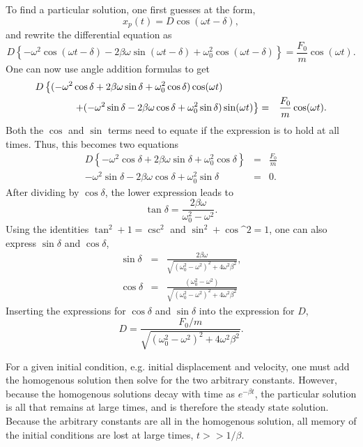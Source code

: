 To find a particular solution, one first guesses at the form,
\begin{equation}
\label{eq:partform}
x_p(t)=D\cos(\omega t-\delta),
\end{equation}
and rewrite the differential equation as
\begin{equation}
D\left\{-\omega^2\cos(\omega t-\delta)-2\beta\omega\sin(\omega t-\delta)+\omega_0^2\cos(\omega t-\delta)\right\}=\frac{F_0}{m}\cos(\omega t).
\end{equation}
One can now use angle addition formulas to get
\begin{eqnarray}
D\left\{(-\omega^2\cos\delta+2\beta\omega\sin\delta+\omega_0^2\cos\delta)\cos(\omega t)\right.\hspace*{36pt}&&\\
\nonumber
\left.+(-\omega^2\sin\delta-2\beta\omega\cos\delta+\omega_0^2\sin\delta)\sin(\omega t)\right\}
&=&\frac{F_0}{m}\cos(\omega t).
\end{eqnarray}
Both the $\cos$ and $\sin$ terms need to equate if the expression is to hold at all times. Thus, this becomes two equations
\begin{eqnarray}
D\left\{-\omega^2\cos\delta+2\beta\omega\sin\delta+\omega_0^2\cos\delta\right\}&=&\frac{F_0}{m}\\
\nonumber
-\omega^2\sin\delta-2\beta\omega\cos\delta+\omega_0^2\sin\delta&=&0.
\end{eqnarray}
After dividing by $\cos\delta$, the lower expression leads to
\begin{equation}
\tan\delta=\frac{2\beta\omega}{\omega_0^2-\omega^2}.
\end{equation}
Using the identities $\tan^2+1=\csc^2$ and $\sin^2+\cos\^2=1$, one can also express $\sin\delta$ and $\cos\delta$,
\begin{eqnarray}
\sin\delta&=&\frac{2\beta\omega}{\sqrt{(\omega_0^2-\omega^2)^2+4\omega^2\beta^2}},\\
\nonumber
\cos\delta&=&\frac{(\omega_0^2-\omega^2)}{\sqrt{(\omega_0^2-\omega^2)^2+4\omega^2\beta^2}}
\end{eqnarray}
Inserting the expressions for $\cos\delta$ and $\sin\delta$ into the expression for $D$,
\begin{equation}
\label{eq:Ddrive}
D=\frac{F_0/m}{\sqrt{(\omega_0^2-\omega^2)^2+4\omega^2\beta^2}}.
\end{equation}

For a given initial condition, e.g. initial displacement and velocity, one must add the homogenous solution then solve for the two arbitrary constants. However, because the homogenous solutions decay with time as $e^{-\beta t}$, the particular solution is all that remains at large times, and is therefore the steady state solution. Because the arbitrary constants are all in the homogenous solution, all memory of the initial conditions are lost at large times, $t>>1/\beta$.

